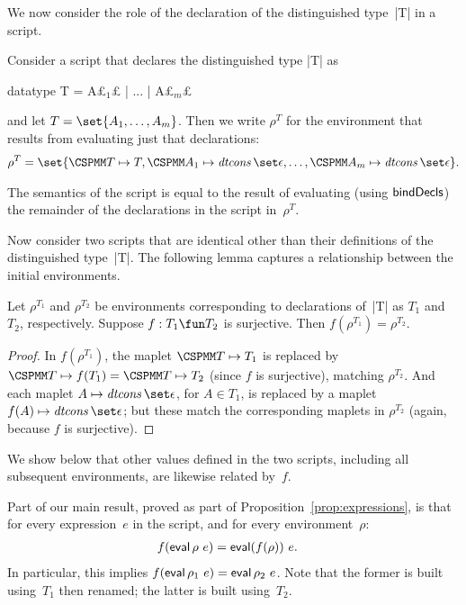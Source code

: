 
We now consider the role of the declaration of the distinguished type~|T| in
a script.
%
\begin{definition}
\label{def:initial-env}
Consider a script that declares the distinguished type |T| as
\begin{cspm}
  datatype T = A£$_1$£ | ... | A£$_m$£
\end{cspm}
and let $T = \set{A_1,\ldots, A_m}$.  Then we write $\rho^{T}$ for the
environment that results from evaluating just that declarations:
\begin{eqnarray*}
\rho^T = \set{\M T \mapsto T, \M A_1 \mapsto \dtcons\set\epsilon, \ldots,
   \M A_m \mapsto \dtcons\set\epsilon}. \\
\end{eqnarray*}
\end{definition}
%
The semantics of the script is equal to the result of evaluating (using
$\mathop{\sf bindDecls}$) the remainder of the declarations in the script in~$\rho^T$.

Now consider two scripts that are identical other than their definitions of the
distinguished type~|T|.
The following lemma captures a relationship between the initial environments.
%
\begin{lemma}
\label{lem:distinguished-type-declaration}
Let $\rho^{T_1}$ and $\rho^{T_2}$ be environments corresponding to
declarations of~|T| as $T_1$ and $T_2$, respectively.  Suppose $f: T_1 \fun
T_2$ is surjective.  Then $f(\rho^{T_1}) = \rho^{T_2}$.
\end{lemma}
%
\begin{proof}
In $f(\rho^{T_1})$, the maplet $\M T \mapsto T_1$ is replaced by $\M T \mapsto
f(T_1) = \M T \mapsto T_2$ (since $f$ is surjective), matching $\rho^{T_2}$.
And each maplet $A \mapsto \dtcons\set\epsilon$, for $A \in T_1$, is replaced
by a maplet $f(A) \mapsto \dtcons\set\epsilon$; but these match the
corresponding maplets in $\rho^{T_2}$ (again, because $f$ is surjective).
\end{proof}


We show below that other values defined in the two scripts, including all
subsequent environments, are likewise related by~$f$.

Part of our main result, proved as part of Proposition~\ref{prop:expressions},
is that for every expression~$e$ in the script, and for every
environment~$\rho$:
\begin{eqnarray*}
f(\mathop{\sf eval} \rho ~ e) & = \mathop{\sf eval} (f(\rho)) ~e .
\end{eqnarray*}
%
In particular, this implies $f(\mathop{\sf eval} \rho_1 ~ e) = \mathop{\sf eval} \rho_2 ~e$.  Note that
the former is built using~$T_1$ then renamed; the latter is built using~$T_2$.

